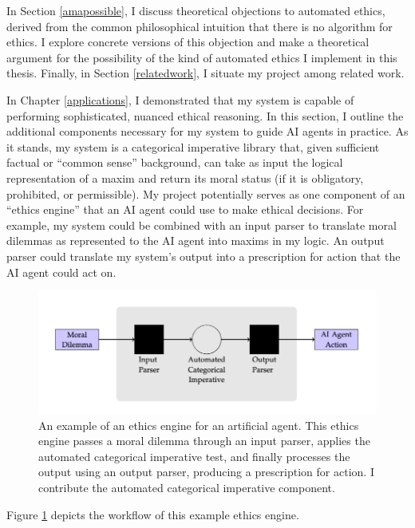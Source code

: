 \begin{isabellebody}
\begin{isamarkuptext}
In Section \ref{amapossible}, I discuss theoretical objections to automated ethics, derived from the
common philosophical intuition that there is no algorithm for ethics. I explore concrete versions of 
this objection and make a theoretical argument for the possibility of the kind of automated ethics 
I implement in this thesis. Finally, in Section \ref{relatedwork}, I situate my project among related work.%
\end{isamarkuptext}\isamarkuptrue%
%
\isadelimdocument
%
\endisadelimdocument
%
\isatagdocument
%
\isamarkuptrue%
%
\endisatagdocument
{\isafolddocument}%
%
\isadelimdocument
%
\endisadelimdocument
%
\begin{isamarkuptext}%
In Chapter \ref{applications}, I demonstrated that my system is capable of performing sophisticated,
nuanced ethical reasoning. In this section, I outline the additional components necessary for my system
to guide AI agents in practice. As it stands, my system is a categorical imperative library that, given
sufficient factual or ``common sense'' background, can take 
as input the logical representation of a maxim and return its moral status (if it is obligatory, 
prohibited, or permissible). My project potentially 
serves as one component of an ``ethics engine'' that an AI agent could use to make ethical decisions.
For example, my system could be combined with an input parser to translate moral dilemmas as represented 
to the AI agent into maxims in my logic. An output parser could translate my system's output
into a prescription for action that the AI agent could act on. \begin{figure}
\includegraphics[scale=0.43]{AI_engine.png}
\caption{An example of an ethics engine for an artificial agent. This ethics engine passes a moral dilemma 
through an input parser, applies the automated categorical imperative test, and finally processes the 
output using an output parser, producing a prescription for action. I contribute the automated categorical 
imperative component.} \label{fig:AIengine}
\end{figure} Figure \ref{fig:AIengine} depicts the workflow of this example ethics engine.


\end{isamarkuptext}
\end{isabellebody}
